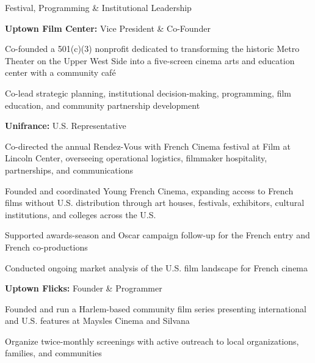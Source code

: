 \begin{rubric}{Festival, Programming \& Institutional Leadership}
\AdeNoentry

  \entry*[2024-present]%
  \textbf{Uptown Film Center:} Vice President \& Co-Founder
  \par
  \begin{cvitems}
    \item Co-founded a 501(c)(3) nonprofit dedicated to transforming the historic Metro
      Theater on the Upper West Side into a five-screen cinema arts and education center
      with a community caf\'e
    \item Co-lead strategic planning, institutional decision-making, programming, film
      education, and community partnership development
  \end{cvitems}

  \entry*[2013-2024]%
  \textbf{Unifrance:} U.S. Representative
  \par
  \begin{cvitems}
    \item Co-directed the annual Rendez-Vous with French Cinema festival at Film at Lincoln
      Center, overseeing operational logistics, filmmaker hospitality, partnerships, and
      communications
    \item Founded and coordinated Young French Cinema, expanding access to French films
      without U.S. distribution through art houses, festivals, exhibitors, cultural
      institutions, and colleges across the U.S.
    \item Supported awards-season and Oscar campaign follow-up for the French entry and
      French co-productions
    \item Conducted ongoing market analysis of the U.S. film landscape for French cinema
  \end{cvitems}

  \entry*[2016-present]%
  \textbf{Uptown Flicks:} Founder \& Programmer
  \par
  \begin{cvitems}
    \item Founded and run a Harlem-based community film series presenting international
      and U.S. features at Maysles Cinema and Silvana
    \item Organize twice-monthly screenings with active outreach to local organizations,
      families, and communities
  \end{cvitems}

\end{rubric}

